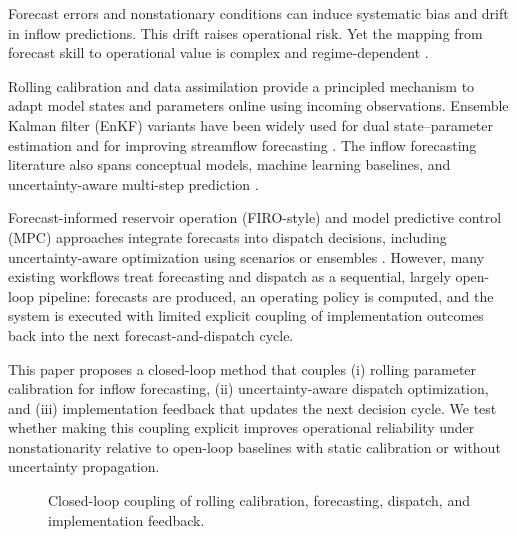 \documentclass[conference]{IEEEtran}
\begin{document}
Forecast errors and nonstationary conditions can induce systematic bias and drift in inflow
predictions. This drift raises operational risk. Yet the mapping from forecast skill to
operational value is complex and regime-dependent \cite{turner2017complex,milly2008stationarity}.

Rolling calibration and data assimilation provide a principled mechanism to adapt model
states and parameters online using incoming observations. Ensemble Kalman filter (EnKF)
variants have been widely used for dual state--parameter estimation and for improving
streamflow forecasting \cite{moradkhani2005dual,evensen2003ensemble,maxwell2018constraining,xiong2019identifying}.
The inflow forecasting literature also spans conceptual models, machine learning baselines,
and uncertainty-aware multi-step prediction
\cite{gragne2015improving,kratzert2018rainfall,kratzert2019learning,fan2023explainable}.

Forecast-informed reservoir operation (FIRO-style) and model predictive control (MPC)
approaches integrate forecasts into dispatch decisions, including uncertainty-aware
optimization using scenarios or ensembles \cite{liu2020reservoir,cestari2023scenario,mayne2000constrained,zarei2021machine}.
However, many existing workflows treat forecasting and dispatch as a sequential, largely
open-loop pipeline: forecasts are produced, an operating policy is computed, and the system
is executed with limited explicit coupling of implementation outcomes back into the next
forecast-and-dispatch cycle.

This paper proposes a closed-loop method that couples (i) rolling parameter calibration for
inflow forecasting, (ii) uncertainty-aware dispatch optimization, and (iii) implementation
feedback that updates the next decision cycle. We test whether making this coupling explicit
improves operational reliability under nonstationarity relative to open-loop baselines with
static calibration or without uncertainty propagation.

\begin{figure}[t]
\centering

\caption{Closed-loop coupling of rolling calibration, forecasting, dispatch, and implementation feedback.}
\label{fig:teaser}
\end{figure}
\end{document}
